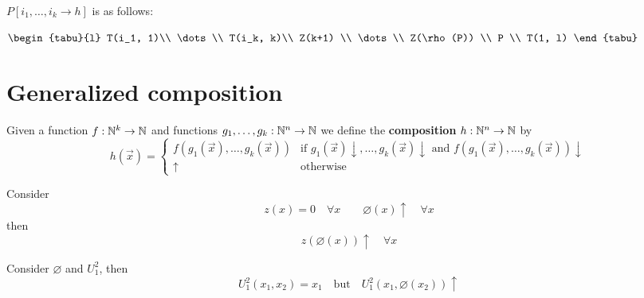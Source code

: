 $P[i_1,\dots,i_k \rightarrow h]$ is as follows:

$\begin{tabu}{l}
  T(i_1, 1)\\
  \dots    \\     
  T(i_k, k)\\          
  Z(k+1) \\
  \dots  \\
  Z(\rho(P))     \\     
  P \\
  T(1, l)
\end{tabu}$

\section {Generalized composition}
\begin{definition}
  Given a function
$f: \mathbb{N}^k \rightarrow \mathbb{N}$ and functions
$g_1,\dots,g_k: \mathbb{N}^n \rightarrow \mathbb{N}$
we define the \textbf{composition} $h: \mathbb{N}^n \rightarrow \mathbb{N}$ by 
  \begin{equation*}
    h(\vec{x}) = \begin{cases}
      f(g_1(\vec{x}), \dots, g_k(\vec{x})) & \mbox{if } g_1(\vec{x})\downarrow, \dots, g_k(\vec{x})\downarrow \mbox{ and } f(g_1(\vec{x}), \dots, g_k(\vec{x}))\downarrow\\
      \uparrow & \mbox{otherwise}
    \end{cases}
  \end{equation*}
\end{definition}

\begin{example}
  Consider
  \begin{equation*}
    z(x)=0\quad \forall x \qquad \varnothing(x)\uparrow\quad \forall x
  \end{equation*}
  then
  \begin{equation*}
    z(\varnothing(x))\uparrow \quad \forall x
  \end{equation*}
\end{example}

\begin{example}
  Consider $\varnothing$ and $U^2_1$, then
  \begin{equation*}
    U^2_1(x_1, x_2)=x_1 \quad \text{but} \quad U^2_1(x_1, \varnothing(x_2))\uparrow
  \end{equation*}
\end{example}

